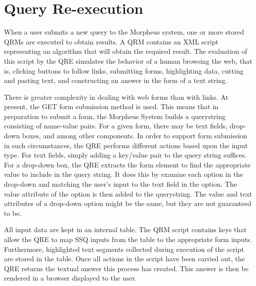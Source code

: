 \section{Query Re-execution}
When a user submits a new query to the Morpheus system, one or more
stored QRMs are executed to obtain results. A QRM contains an XML
script representing an algorithm that will obtain the required result.
The evaluation of this script by the QRE simulates the behavior of a
human browsing the web, that is, clicking buttons to follow links,
submitting forms, highlighting data, cutting and pasting text, and
constructing an answer in the form of a text string.

There is greater complexity in dealing with web forms than with links.
At present, the GET form submission method is used. This means that in preparation to 
submit a form, the Morpheus System builds a querystring consisting of name-value pairs.
For a given form, there may be text fields, drop-down boxes, and among other components.
In order to support form submission in such circumstances, the QRE performs
different actions based upon the input type. For text fields, simply
adding a key/value pair to the query string suffices. For a drop-down
box, the QRE extracts the form element to find the appropriate value to
include in the query string. It does this by examine each option in the drop-down and 
matching the user's input to the text field in the option. The value attribute of the option
is then added to the querystring. The value and text attributes of a drop-down option might 
be the same, but they are not guaranteed to be. 

All input data are kept in an internal table. The QRM script contains
keys that allow the QRE to map SSQ inputs from the table to the
appropriate form inputs. Furthermore, highlighted text segments
collected during execution of the script are stored in the table.
Once all actions in the script have been carried out, the QRE returns
the textual answer this process has created. This answer is then be
rendered in a browser displayed to the user.
